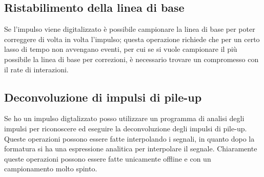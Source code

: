 \subsection{Ristabilimento della linea di base}
Se l'impulso viene digitalizzato \`e possibile campionare la linea di base per poter correggere di volta in volta l'impulso;
questa operazione richiede che per un certo lasso di tempo non avvengano eventi, per cui se si vuole campionare il pi\`u possibile
la linea di base per correzioni, \`e necessario trovare un compromesso con il rate di interazioni.
\subsection{Deconvoluzione di impulsi di pile-up}
Se ho un impulso digtalizzato posso utilizzare un programma di analisi degli impulsi per riconoscere ed eseguire la deconvoluzione degli impulsi di pile-up.
Queste operazioni possono essere fatte interpolando i segnali, in quanto dopo la formatura si ha una espressione analitica per interpolare il segnale.
Chiaramente queste operazioni possono essere fatte unicamente offline e con un campionamento molto spinto.
